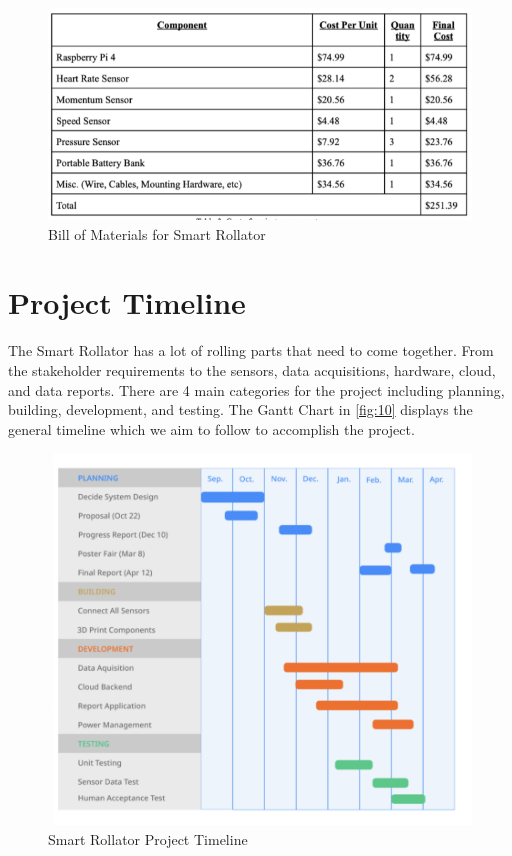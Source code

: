\documentclass{article}
\begin{document}
\begin{figure}[!h]
    \centering
    \includegraphics[scale=0.92]{sysc4907_BOM.png}
    \caption{Bill of Materials for Smart Rollator}
    \label{fig:9}
\end{figure}



\section{Project Timeline}
The Smart Rollator has a lot of rolling parts that need to come together. From the stakeholder requirements to the sensors, data acquisitions, hardware, cloud, and data reports. There are 4 main categories for the project including planning, building, development, and testing. The Gantt Chart in \autoref{fig:10} displays the general timeline which we aim to follow to accomplish the project.
\begin{figure}[!h]
    \centering
    \includegraphics[width=0.8 \columnwidth]{sysc4907_gantt.png}
    \caption{Smart Rollator Project Timeline}
    \label{fig:10}
\end{figure}
\end{document}
